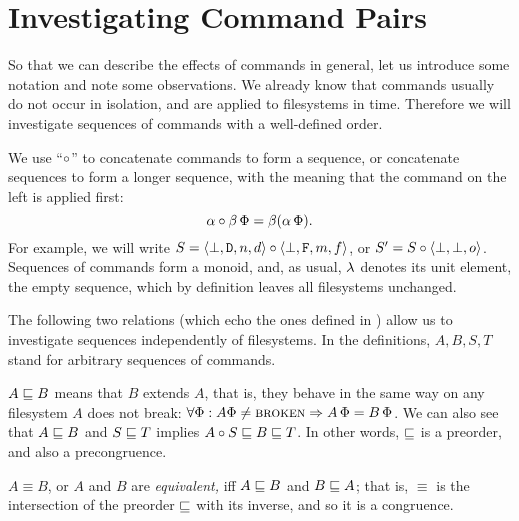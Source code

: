 

\section{Investigating Command Pairs}\label{section_axioms}

So that we can describe the effects of commands in general,
let us introduce some notation
and note some observations.
We already know that
commands usually do not occur in isolation,
and are applied to filesystems in time.
Therefore we will investigate sequences of commands with a well-defined order.
\begin{mydef}
We use ``$\circ$'' to concatenate commands to form a sequence, or concatenate sequences to form a longer sequence,
with the meaning that the command on the left is applied first:
\[ \alpha\circ\beta\,\Phi = \beta(\alpha\,\Phi). \]
For example, we will write
$S=\langle{\bot,\mathtt{D},n,d}\rangle\circ\langle{\bot,\mathtt{F},m,f}\rangle$, or $S'=S\circ\langle{\bot,\bot,o}\rangle$.
Sequences of commands form a monoid, and, as usual,
$\lambda$ denotes its unit element, the empty sequence,
which by definition leaves all filesystems unchanged.
\end{mydef}

The following two relations 
(which echo the ones defined in \cite{NREC})
allow us to investigate sequences independently of filesystems.
In the definitions, $A,B,S,T$ stand for arbitrary sequences of commands.

\begin{mydef}[$\eqext$]
$A\sqsubseteq B$ means that $B$ extends $A$,
that is, they behave in the same way
on any filesystem $A$ does not break:
$\forall \Phi: A\Phi\neq\text{\normalfont\scshape{broken}}\Rightarrow A\,\Phi=B\,\Phi$.
We can also see that $A\sqsubseteq B$ and $S\sqsubseteq T$ implies $A\circ S\sqsubseteq B\sqsubseteq T$.
In other words, $\eqext$ is a preorder, and also a precongruence.
\end{mydef}

\begin{mydef}[$\equiv$]
$A\equiv B$,
or $A$ and $B$ are \emph{equivalent,}
iff $A\sqsubseteq B$ and $B\sqsubseteq A$;
that is, $\equiv$ is the intersection of the preorder $\eqext$ with its inverse,
and so it is a congruence.
\end{mydef}

